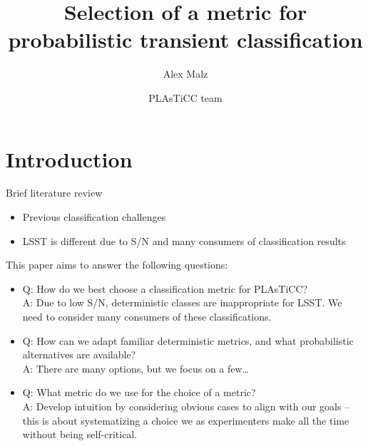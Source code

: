 \documentclass[iop]{emulateapj}
\newcommand{\plasticc}{PLAsTiCC}
\begin{document}
\title{Selection of a metric for probabilistic transient classification}

\author{Alex Malz}

\author{PLAsTiCC team}


\begin{abstract}

\end{abstract}


\maketitle

\section{Introduction}
\label{sec:introduction}

Brief literature review

\begin{itemize}
	\item Previous classification challenges
	\item LSST is different due to S/N and many consumers of classification 
results
\end{itemize}

This paper aims to answer the following questions:

\begin{itemize}
	\item Q: How do we best choose a classification metric for \plasticc?\\
	A: Due to low S/N, deterministic classes are inappropriate for LSST.  
We need to consider many consumers of these classifications.
	\item Q: How can we adapt familiar deterministic metrics, and what 
probabilistic alternatives are available?\\
	A: There are many options, but we focus on a few\dots
	\item Q: What metric do we use for the choice of a metric?\\
	A: Develop intuition by considering obvious cases to align with our 
goals -- this is about systematizing a choice we as experimenters make all the 
time without being self-critical.
\end{itemize}
\end{document}
